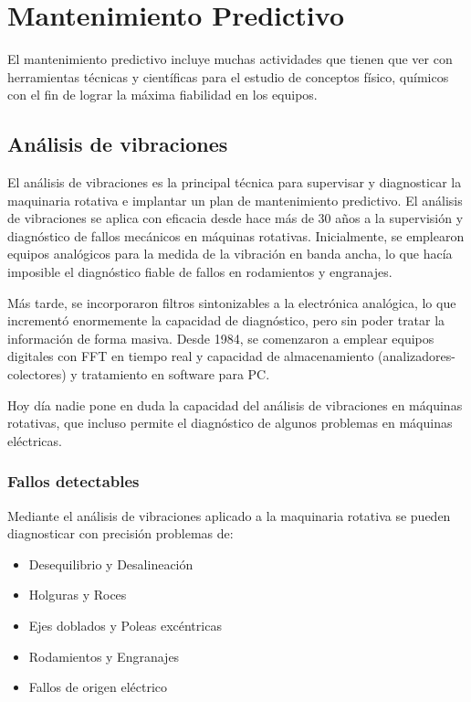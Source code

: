 \documentclass[../main]{subfiles}
\begin{document}
\section{Mantenimiento Predictivo}



El mantenimiento predictivo incluye muchas actividades que tienen que ver con herramientas técnicas y científicas para el estudio de conceptos físico, químicos con el fin de lograr la máxima fiabilidad en los equipos.



\subsection{Análisis de vibraciones}


El análisis de vibraciones es la principal técnica para supervisar y diagnosticar la maquinaria rotativa e implantar un plan de mantenimiento predictivo.
El análisis de vibraciones se aplica con eficacia desde hace más de 30 años a la supervisión y diagnóstico de fallos mecánicos en máquinas rotativas. Inicialmente, se emplearon equipos analógicos para la medida de la vibración en banda ancha, lo que hacía imposible el diagnóstico fiable de fallos en rodamientos y engranajes.

Más tarde, se incorporaron filtros sintonizables a la electrónica analógica, lo que incrementó enormemente la capacidad de diagnóstico, pero sin poder tratar la información de forma masiva. Desde 1984, se comenzaron a emplear equipos digitales con FFT en tiempo real y capacidad de almacenamiento (analizadores-colectores) y tratamiento en software para PC.

Hoy día nadie pone en duda la capacidad del análisis de vibraciones en máquinas rotativas, que incluso permite el diagnóstico de algunos problemas en máquinas eléctricas.

\subsubsection{Fallos detectables}
Mediante el análisis de vibraciones aplicado a la maquinaria rotativa se pueden diagnosticar con precisión problemas de:
\begin{itemize}
\item Desequilibrio y Desalineación
\item Holguras y Roces
\item Ejes doblados y Poleas excéntricas
\item Rodamientos y Engranajes
\item Fallos de origen eléctrico
\end{itemize}
\end{document}
